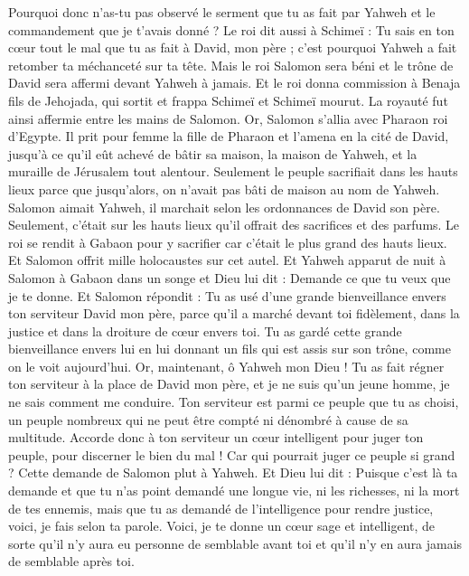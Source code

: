 \begin{multicols}{2}
Pourquoi donc n'as-tu pas observé le serment que tu as fait par Yahweh et le commandement que je t'avais donné ?
Le roi dit aussi à Schimeï : Tu sais en ton cœur tout le mal que tu as fait à David, mon père ; c'est pourquoi Yahweh a fait retomber ta méchanceté sur ta tête.
Mais le roi Salomon sera béni et le trône de David sera affermi devant Yahweh à jamais.
Et le roi donna commission à Benaja fils de Jehojada, qui sortit et frappa Schimeï et Schimeï mourut. La royauté fut ainsi affermie entre les mains de Salomon.
\VerseOne{}Or, Salomon s'allia avec Pharaon roi d'Egypte. Il prit pour femme la fille de Pharaon et l'amena en la cité de David, jusqu'à ce qu'il eût achevé de bâtir sa maison, la maison de Yahweh, et la muraille de Jérusalem tout alentour.
Seulement le peuple sacrifiait dans les hauts lieux parce que jusqu’alors, on n’avait pas bâti de maison au nom de Yahweh.
Salomon aimait Yahweh, il marchait selon les ordonnances de David son père. Seulement, c’était sur les hauts lieux qu’il offrait des sacrifices et des parfums.
Le roi se rendit à Gabaon pour y sacrifier car c'était le plus grand des hauts lieux. Et Salomon offrit mille holocaustes sur cet autel.
Et Yahweh apparut de nuit à Salomon à Gabaon dans un songe et Dieu lui dit : Demande ce que tu veux que je te donne.
Et Salomon répondit : Tu as usé d'une grande bienveillance envers ton serviteur David mon père, parce qu’il a marché devant toi fidèlement, dans la justice et dans la droiture de cœur envers toi. Tu as gardé cette grande bienveillance envers lui en lui donnant un fils qui est assis sur son trône, comme on le voit aujourd'hui.
Or, maintenant, ô Yahweh mon Dieu ! Tu as fait régner ton serviteur à la place de David mon père, et je ne suis qu'un jeune homme, je ne sais comment me conduire.
Ton serviteur est parmi ce peuple que tu as choisi, un peuple nombreux qui ne peut être compté ni dénombré à cause de sa multitude.
Accorde donc à ton serviteur un cœur intelligent pour juger ton peuple, pour discerner le bien du mal ! Car qui pourrait juger ce peuple si grand ?
Cette demande de Salomon plut à Yahweh.
Et Dieu lui dit : Puisque c’est là ta demande et que tu n'as point demandé une longue vie, ni les richesses, ni la mort de tes ennemis, mais que tu as demandé de l'intelligence pour rendre justice,
voici, je fais selon ta parole. Voici, je te donne un cœur sage et intelligent, de sorte qu'il n'y aura eu personne de semblable avant toi et qu’il n'y en aura jamais de semblable après toi.

\end{multicols}
